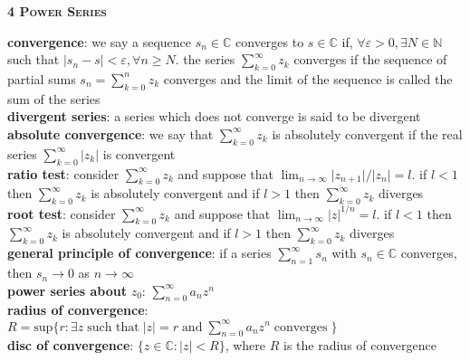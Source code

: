 \documentclass[a4paper]{article}
\newcommand*\abs[1]{\vert #1 \vert}
\begin{document}
\begin{framed}
	\begin{center}
		\textbf{\textsc{4 Power Series}}
	\end{center}
	\textbf{convergence}: we say a sequence $s_n \in \mathbb{C}$ converges to $s \in \mathbb{C}$ if, $\forall \varepsilon > 0, \exists N \in \mathbb{N}$ such that $\abs{s_n - s} < \varepsilon, \forall n \geq N$. the series $\sum_{k=0}^\infty z_k$ converges if the sequence of partial sums $s_n = \sum_{k=0}^n z_k$ converges and the limit of the sequence is called the sum of the series\\
	
	\noindent
	\textbf{divergent series}: a series which does not converge is said to be divergent\\
	
	\noindent
	\textbf{absolute convergence}: we say that $\sum_{k=0}^\infty z_k$ is absolutely convergent if the real series $\sum_{k=0}^\infty \abs{z_k}$ is convergent\\
	
	\noindent
	\textbf{ratio test}: consider $\sum_{k=0}^\infty z_k$ and suppose that $\lim_{n \rightarrow \infty}\abs{z_{n+1}} / \abs{z_n} = l$. if $l < 1$ then $\sum_{k=0}^\infty z_k$ is absolutely convergent and if $l > 1$ then $\sum_{k=0}^\infty z_k$ diverges\\
	
	\noindent
	\textbf{root test}: consider $\sum_{k=0}^\infty z_k$ and suppose that $\lim_{n \rightarrow \infty}\abs{z}^{1/n} = l$. if $l < 1$ then $\sum_{k=0}^\infty z_k$ is absolutely convergent and if $l > 1$ then $\sum_{k=0}^\infty z_k$ diverges\\
	
	\noindent
	\textbf{general principle of convergence}: if a series $\sum_{n=1}^\infty s_n$ with $s_n \in \mathbb{C}$ converges, then $s_n \rightarrow 0$ as $n \rightarrow \infty$\\
	
	\noindent
	\textbf{power series about} $z_0$: $\sum_{n=0}^\infty a_nz^n$\\
	
	\noindent
	\textbf{radius of convergence}: $R = \text{sup}\{r : \exists z \; \text{such that} \; \abs{z} = r \; \text{and} \; \sum_{n=0}^\infty a_nz^n \; \text{converges} \; \}$\\
	
	\noindent
	\textbf{disc of convergence}: $\{ z \in \mathbb{C} : \abs{z} < R\}$, where $R$ is the radius of convergence\\
	

\end{framed}
\end{document}

